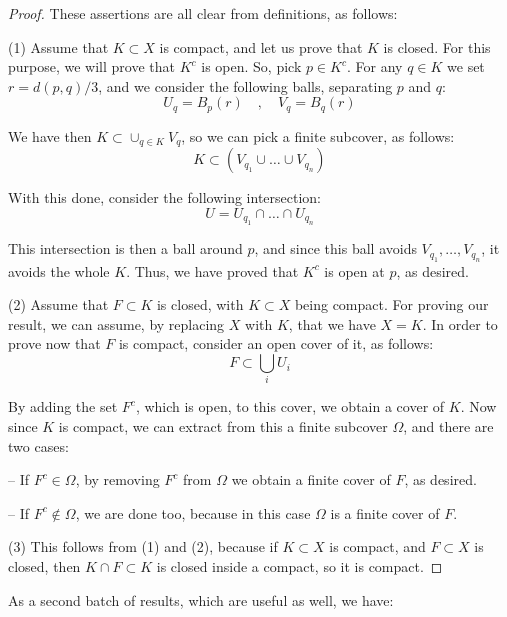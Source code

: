 \documentclass[12pt]{amsbook}
\begin{document}
\begin{proof}
These assertions are all clear from definitions, as follows:

\medskip

(1) Assume that $K\subset X$ is compact, and let us prove that $K$ is closed. For this purpose, we will prove that $K^c$ is open. So, pick $p\in K^c$. For any $q\in K$ we set $r=d(p,q)/3$, and we consider the following balls, separating $p$ and $q$:
$$U_q=B_p(r)\quad,\quad V_q=B_q(r)$$

We have then $K\subset\cup_{q\in K}V_q$, so we can pick a finite subcover, as follows:
$$K\subset\left(V_{q_1}\cup\ldots\cup V_{q_n}\right)$$

With this done, consider the following intersection:
$$U=U_{q_1}\cap\ldots\cap U_{q_n}$$

This intersection is then a ball around $p$, and since this ball avoids $V_{q_1},\ldots,V_{q_n}$, it avoids the whole $K$. Thus, we have proved that $K^c$ is open at $p$, as desired.

\medskip

(2) Assume that $F\subset K$ is closed, with $K\subset X$ being compact. For proving our result, we can assume, by replacing $X$ with $K$, that we have $X=K$. In order to prove now that $F$ is compact, consider an open cover of it, as follows:
$$F\subset\bigcup_iU_i$$

By adding the set $F^c$, which is open, to this cover, we obtain a cover of $K$. Now since $K$ is compact, we can extract from this a finite subcover $\Omega$, and there are two cases:

\medskip

-- If $F^c\in\Omega$, by removing $F^c$ from $\Omega$ we obtain a finite cover of $F$, as desired.

\medskip

-- If $F^c\notin\Omega$, we are done too, because in this case $\Omega$ is a finite cover of $F$.

\medskip

(3) This follows from (1) and (2), because if $K\subset X$ is compact, and $F\subset X$ is closed, then $K\cap F\subset K$ is closed inside a compact, so it is compact.
\end{proof}

As a second batch of results, which are useful as well, we have:
\end{document}
